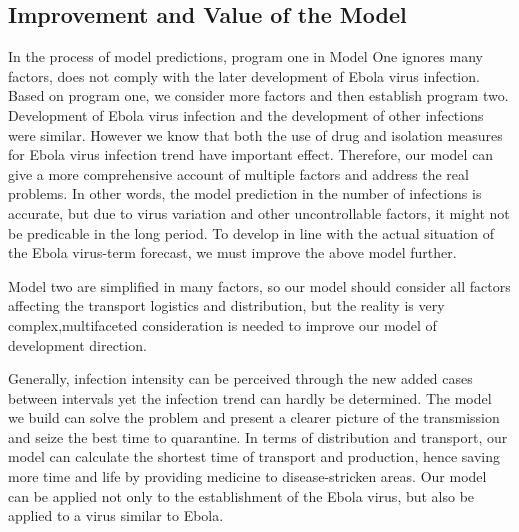 \documentclass{icmmcm}
\begin{document}
\subsection{Improvement and Value of the Model}
In the process of model predictions, program one in Model One
ignores many factors, does not comply with the later development
of Ebola virus infection. Based on program one, we consider more
factors and then establish program two. Development of Ebola
virus infection and the development of other infections were
similar. However we know that both the use of drug and isolation
measures for Ebola virus infection trend have important
effect. Therefore, our model can give a more comprehensive
account of multiple factors and address the real problems. In
other words, the model prediction in the number of infections is
accurate, but due to virus variation and other uncontrollable
factors, it might not be predicable in the long period. To
develop in line with the actual situation of the Ebola
virus-term forecast, we must improve the above model further.
\par Model two are simplified in many factors, so our model
should consider all factors affecting the transport logistics
and distribution, but the reality is very complex,multifaceted
consideration is needed to improve our model of development
direction.
\par Generally, infection intensity can be perceived through
the new added cases between intervals yet the infection trend
can hardly be determined. The model we build can solve the
problem and present a clearer picture of the transmission and
seize the best time to quarantine. In terms of distribution and
transport, our model can calculate the shortest time of
transport and production, hence saving more time and life by
providing medicine to disease-stricken areas.
Our model can be applied not only to the
establishment of the Ebola virus, but also be applied to a virus
similar to Ebola.
\end{document}
